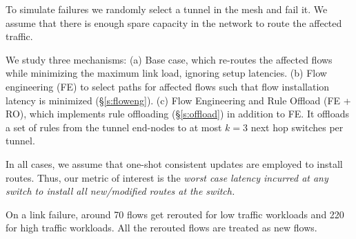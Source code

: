 To simulate failures we randomly select a tunnel in the mesh and fail it. We assume that there is enough spare capacity in the network to route the affected traffic.

We study three  mechanisms: (a) Base case, which re-routes the affected flows while minimizing the maximum link load, ignoring setup latencies.%
(b) Flow engineering (FE) to select paths for affected flows such that flow installation latency is minimized (\S\ref{s:floweng}). (c) Flow Engineering and Rule Offload (FE + RO), which  implements rule offloading (\S\ref{s:offload})  in addition to FE. It offloads a set of rules from the tunnel end-nodes to at most $k=3$ next hop switches per tunnel. 

In all cases, we assume that one-shot consistent updates are employed to install routes. Thus, our metric of interest is the {\em worst case latency incurred at any switch to install all new/modified routes at the switch.}

On a link failure, around 70 flows get rerouted for low traffic workloads and 220 for high traffic workloads. All the rerouted flows are treated as new flows.  




